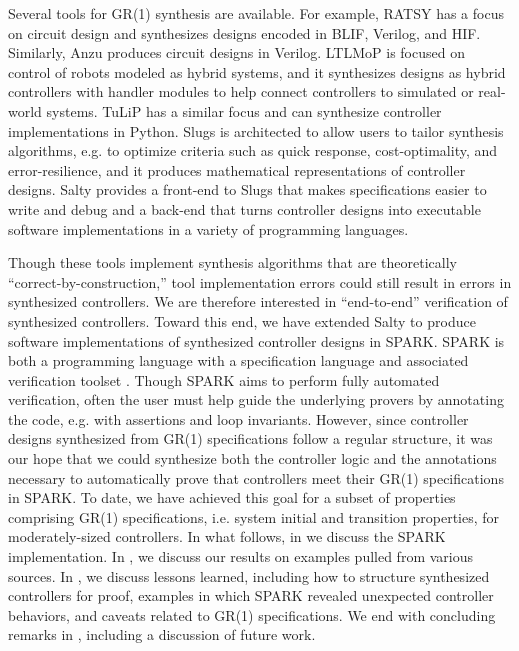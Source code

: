 \documentclass[runningheads]{llncs}
\begin{document}
Several tools for GR(1) synthesis are available. 
For example, RATSY %
\cite{bloem2010ratsy} has a focus on circuit design and synthesizes designs 
encoded in BLIF, %
Verilog, and HIF. %
Similarly, Anzu \cite{jobstmann2007anzu} produces circuit designs in Verilog.
LTLMoP 
\cite{finucane2010ltlmop} is focused on control of robots modeled as hybrid systems, 
and it synthesizes designs as hybrid controllers with handler modules to help connect controllers to simulated or real-world systems. 
TuLiP 
\cite{TuLiP2011} has a similar focus and can synthesize controller implementations in Python. 
Slugs 
\cite{Ehlers2016} is architected to allow users to tailor synthesis algorithms,
 e.g. to optimize criteria such as quick response, cost-optimality, and error-resilience, and it produces mathematical representations of controller designs.
Salty \cite{elliott2019salty} provides a front-end to Slugs that makes specifications easier to write and debug and 
a back-end that turns controller designs into executable software implementations in a variety of programming languages.

Though these tools implement synthesis algorithms that are theoretically ``correct-by-construction,'' 
tool implementation errors could still result in errors in synthesized controllers. 
We are therefore interested in ``end-to-end'' verification of synthesized controllers. %
Toward this end, we have extended Salty to produce software implementations of synthesized controller designs in SPARK. 
SPARK is both a programming language with a specification language and associated verification toolset \cite{hoang2015spark}. 
Though SPARK aims to perform fully automated verification, often the user must help guide the underlying provers by
annotating the code, e.g. with assertions and loop invariants. 
However, since controller designs synthesized from GR(1) specifications follow a regular structure, it was our hope that we could 
synthesize both the controller logic and the annotations necessary to automatically prove that controllers meet their GR(1) specifications in SPARK. 
To date, we have achieved this goal for a subset of properties comprising GR(1) specifications, 
i.e. system initial and transition properties, for moderately-sized controllers.
In what follows, in  we discuss the SPARK implementation. 
In , we discuss our results on examples pulled from various sources.
In , we discuss lessons learned, including how to structure synthesized controllers for proof, 
examples in which SPARK revealed unexpected controller behaviors, and caveats related to GR(1) specifications. 
We end with concluding remarks in , including a discussion of future work.
\end{document}
